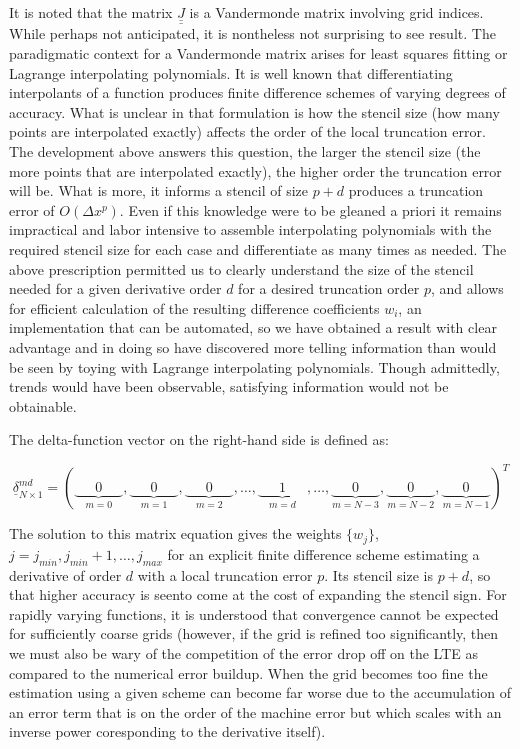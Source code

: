 \documentclass[12pt]{article}
\begin{document}
It is noted that the matrix $\underline{\underline{J}}$ is a Vandermonde matrix involving grid indices. While perhaps not anticipated, it is nontheless not surprising to see result. The paradigmatic context for a Vandermonde matrix arises for least squares fitting or Lagrange interpolating polynomials. It is well known that differentiating interpolants of a function produces finite difference schemes of varying degrees of accuracy. What is unclear in that formulation is how the stencil size (how many points are interpolated exactly) affects the order of the local truncation error. The development above answers this question, the larger the stencil size (the more points that are interpolated exactly), the higher order the truncation error will be. What is more, it informs a stencil of size $p + d$ produces a truncation error of $O(\Delta x^p)$. Even if this knowledge were to be gleaned a priori it remains impractical and labor intensive to assemble interpolating polynomials with the required stencil size for each case and differentiate as many times as needed. The above prescription permitted us to clearly understand the size of the stencil needed for a given derivative order $d$ for a desired truncation order $p$, and allows for efficient calculation of the resulting difference coefficients $w_i$, an implementation that can be automated, so we have obtained a result with clear advantage and in doing so have discovered more telling information than would be seen by toying with Lagrange interpolating polynomials. Though admittedly, trends would have been observable, satisfying information would not be obtainable.

The delta-function vector on the right-hand side is defined as:

$$\underline{\delta}^{md}_{N\times 1} = (\underbrace{\phantom{000}0\phantom{000}}_{m = 0}, \underbrace{\phantom{000}0\phantom{000}}_{m = 1}, \underbrace{\phantom{000}0\phantom{000}}_{m = 2}, \ldots , \underbrace{\phantom{000}1\phantom{000}}_{m = d}, \ldots, \underbrace{\phantom{000}0\phantom{000}}_{m = N - 3}, \underbrace{\phantom{000}0\phantom{000}}_{m = N - 2}, \underbrace{\phantom{000}0\phantom{000}}_{m = N - 1})^T$$

The solution to this matrix equation gives the weights $\{w_j\}$, $j = j_{min}, j_{min} + 1, \ldots, j_{max}$ for an explicit finite difference scheme estimating a derivative of order $d$ with a local truncation error $p$. Its stencil size is $p + d$, so that higher accuracy is seento come at the cost of expanding the stencil sign. For rapidly varying functions, it is understood that convergence cannot be expected for sufficiently coarse grids (however, if the grid is refined too significantly, then we must also be wary of the competition of the error drop off on the LTE as compared to the numerical error buildup. When the grid becomes too fine the estimation using a given scheme can become far worse due to the accumulation of an error term that is on the order of the machine error but which scales with an inverse power coresponding to the derivative itself).
\end{document}
